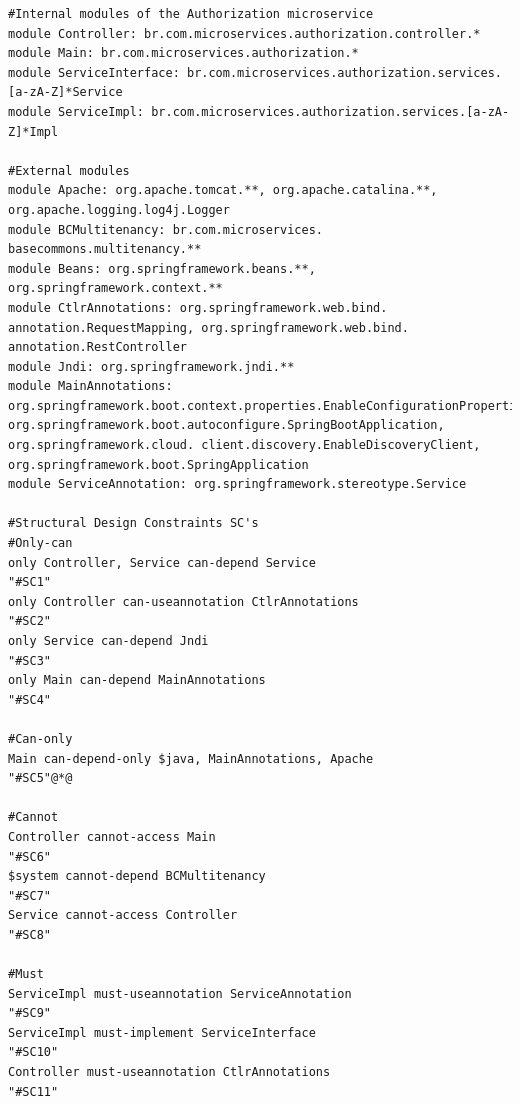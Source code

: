 \documentclass[12pt]{article}
\begin{document}
\begin{lstlisting}[style=colorido, caption={ \textcolor{blue}{Authorization microservice's architectural project specification.}},label={list:especArquiteturalAuthorization}
]
#Internal modules of the Authorization microservice
module Controller: br.com.microservices.authorization.controller.*
module Main: br.com.microservices.authorization.*
module ServiceInterface: br.com.microservices.authorization.services.[a-zA-Z]*Service
module ServiceImpl: br.com.microservices.authorization.services.[a-zA-Z]*Impl

#External modules
module Apache: org.apache.tomcat.**, org.apache.catalina.**, org.apache.logging.log4j.Logger
module BCMultitenancy: br.com.microservices. basecommons.multitenancy.**
module Beans: org.springframework.beans.**, org.springframework.context.**
module CtlrAnnotations: org.springframework.web.bind. annotation.RequestMapping, org.springframework.web.bind. annotation.RestController
module Jndi: org.springframework.jndi.**
module MainAnnotations: org.springframework.boot.context.properties.EnableConfigurationProperties, org.springframework.boot.autoconfigure.SpringBootApplication, org.springframework.cloud. client.discovery.EnableDiscoveryClient,  org.springframework.boot.SpringApplication
module ServiceAnnotation: org.springframework.stereotype.Service

#Structural Design Constraints SC's
#Only-can
only Controller, Service can-depend Service																																								"#SC1"
only Controller can-useannotation CtlrAnnotations																																		"#SC2"
only Service can-depend Jndi																																																							"#SC3"
only Main can-depend MainAnnotations																																															"#SC4"
	
#Can-only
Main can-depend-only $java, MainAnnotations, Apache																																"#SC5"@*@

#Cannot
Controller cannot-access Main																																																						"#SC6"
$system cannot-depend BCMultitenancy																																															"#SC7"
Service cannot-access Controller																																																			"#SC8"

#Must
ServiceImpl must-useannotation ServiceAnnotation																																			"#SC9"
ServiceImpl must-implement ServiceInterface																																								"#SC10"
Controller must-useannotation CtlrAnnotations																																						"#SC11"
\end{lstlisting}
\end{document}
